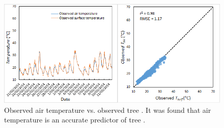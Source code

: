 \documentclass[final,3p,times,authoryear]{elsarticle}
\begin{document}
\begin{figure}[!htbp]
\includegraphics[trim=0mm 0mm 0mm 0mm, clip,scale=0.5]{images/airtreeobs.png}
 \caption{Observed air temperature vs. observed tree . It was found that air temperature is an accurate predictor of tree .} \label{fig:airtreeobs}
\end{figure}
\end{document}
